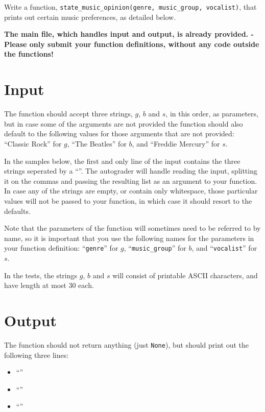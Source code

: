 
Write a function, \texttt{state\_music\_opinion(genre, music\_group, vocalist)},
that prints out certain music preferences, as detailed below.

\textbf{The main file, which handles input and output, is already provided. -
Please only submit your function definitions, without any code outside the functions!}


\section*{Input}

The function should accept three strings,
$g$, $b$ and $s$, in this order, as parameters,
but in case some of the arguments are not provided
the function should also default to the following values
for those arguments that are not provided:
``Classic Rock'' for $g$, ``The Beatles'' for $b$, and ``Freddie Mercury'' for $s$.

In the samples below,
the first and only line of the input contains
the three strings seperated by a ``\text{,}''.
The autograder will handle reading the input,
splitting it on the commas
and passing the resulting list as an argument to your function.
In case any of the strings are empty, or contain only whitespace,
those particular values will not be passed to your function,
in which case it should resort to the defaults.

Note that the parameters of the function
will sometimes need to be referred to by name,
so it is important that you use the following names
for the parameters in your function definition:
``\texttt{genre}'' for $g$, ``\texttt{music\_group}'' for $b$,
and ``\texttt{vocalist}'' for $s$.

In the tests, the strings $g$, $b$ and $s$
will consist of printable ASCII characters,
and have length at most $30$ each.


\section*{Output}

The function should not return anything (just \texttt{None}),
but should print out the following three lines:

\begin{itemize}
    \item ``''
    \item ``''
    \item ``''
\end{itemize}
